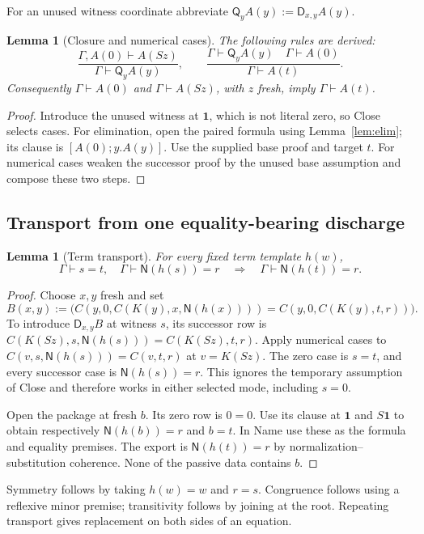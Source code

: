 \documentclass[11pt,letterpaper]{article}
\newtheorem{lemma}[theorem]{Lemma}
\theoremstyle{definition}\newtheorem{definition}[theorem]{Definition}
\theoremstyle{remark}\newtheorem{remark}[theorem]{Remark}
\newcommand{\NF}{\mathsf N}
\newcommand{\DD}{\mathsf D}
\newcommand{\QQ}{\mathsf Q}
\newcommand{\one}{\mathbf1}
\begin{document}
For an unused witness coordinate abbreviate
$\QQ_y A(y):=\DD_{x,y}A(y)$.
\begin{lemma}[Closure and numerical cases]\label{lem:cases}
The following rules are derived:
\[
 \frac{\Gamma,A(0)\vdash A(Sz)}{\Gamma\vdash\QQ_y A(y)},
 \qquad
 \frac{\Gamma\vdash\QQ_y A(y)\quad\Gamma\vdash A(0)}
      {\Gamma\vdash A(t)}.
\]
Consequently $\Gamma\vdash A(0)$ and
$\Gamma\vdash A(Sz)$, with $z$ fresh, imply $\Gamma\vdash A(t)$.
\end{lemma}
\begin{proof}
Introduce the unused witness at $\one$, which is not literal zero, so
Close selects cases. For elimination, open the paired formula using
Lemma~\ref{lem:elim}; its clause is $[A(0);y.A(y)]$. Use the supplied
base proof and target $t$. For numerical cases weaken the successor
proof by the unused base assumption and compose these two steps.
\end{proof}

\subsection{Transport from one equality-bearing discharge}
\begin{lemma}[Term transport]\label{lem:transport}
For every fixed term template $h(w)$,
\[
 \Gamma\vdash s=t,\quad\Gamma\vdash\NF(h(s))=r
 \quad\Longrightarrow\quad
 \Gamma\vdash\NF(h(t))=r.
\]
\end{lemma}
\begin{proof}
Choose $x,y$ fresh and set
\[
 B(x,y):=
 \bigl(C(y,0,C(K(y),x,\NF(h(x))))
       =C(y,0,C(K(y),t,r))\bigr).
\]
To introduce $\DD_{x,y}B$ at witness $s$, its successor row is
$C(K(Sz),s,\NF(h(s)))=C(K(Sz),t,r)$.
Apply numerical cases to
$C(v,s,\NF(h(s)))=C(v,t,r)$ at $v=K(Sz)$.
The zero case is $s=t$, and every successor case is $\NF(h(s))=r$.
This ignores the temporary assumption of Close and therefore works
in either selected mode, including $s=0$.

Open the package at fresh $b$. Its zero row is $0=0$.
Use its clause at $\one$ and $S\one$ to obtain respectively
$\NF(h(b))=r$ and $b=t$. In Name use these as the formula and
equality premises. The export is $\NF(h(t))=r$ by normalization--
substitution coherence. None of the passive data contains $b$.
\end{proof}

Symmetry follows by taking $h(w)=w$ and $r=s$. Congruence follows
using a reflexive minor premise; transitivity follows by joining
at the root. Repeating transport gives replacement on both sides
of an equation.
\end{document}
